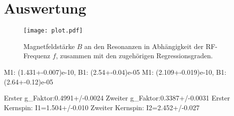 \section{Auswertung}
\label{sec:Auswertung}

\begin{figure}
  \centering
  \texttt{[image: plot.pdf]}
  \caption{Magnetfeldstärke $B$ an den Resonanzen in Abhängigkeit der RF-Frequenz $f$, zusammen mit den zugehörigen Regressionsgraden.}
  \label{fig:plot}
\end{figure}

M1: (1.431+-0.007)e-10, B1: (2.54+-0.04)e-05
M1: (2.109+-0.019)e-10, B1: (2.64+-0.12)e-05

Erster g_Faktor:0.4991+/-0.0024
Zweiter g_Faktor:0.3387+/-0.0031
Erster Kernspin: I1=1.504+/-0.010
Zweiter Kernspin: I2=2.452+/-0.027